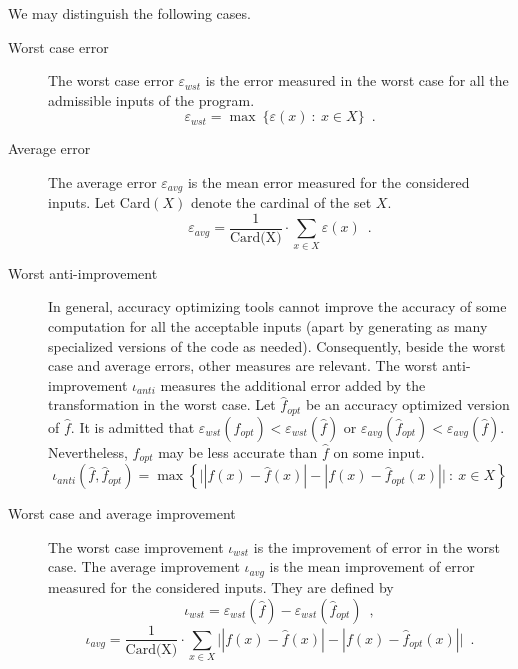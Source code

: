 \documentclass[main.tex]{subfiles}
\begin{document}
We may distinguish the following cases.
\begin{description}
\item[Worst case error] The worst case error $\varepsilon_{wst}$ is the error measured in the worst case for all the admissible inputs of the program. 
\begin{equation}
\varepsilon_{wst} = \max\ \big\{ \varepsilon(x)\ :\ x\in X \big\} \enspace .
\end{equation}
\item[Average error] The average error $\varepsilon_{avg}$ is the mean error measured for the considered inputs. Let Card$(X)$ denote
the cardinal of the set $X$.
 \begin{equation}
\varepsilon_{avg} = \frac{1}{\text{Card(X)}} \cdot \sum_{x\in X} \varepsilon(x) \enspace .
\end{equation}
\item[Worst anti-improvement] In general, accuracy optimizing tools cannot improve the accuracy of some computation for
all the acceptable inputs (apart by generating as many specialized versions of the code as needed). Consequently,
beside the worst case and average errors, other measures are relevant. The worst anti-improvement $\iota_{anti}$
measures the additional error added by the transformation in the worst case. Let $\hat{f}_{opt}$ be an accuracy optimized
version of $\hat{f}$. It is admitted that $\varepsilon_{wst}(\hat{f}_{opt})< \varepsilon_{wst}(\hat{f})$
or $\varepsilon_{avg}(\hat{f}_{opt})< \varepsilon_{avg}(\hat{f})$. Nevertheless, $\hat{f}_{opt}$ may be
less accurate than $\hat{f}$ on some input.
\begin{equation}
\iota_{anti}(\hat{f},\hat{f}_{opt}) = \max \left\{ \big| |f(x)-\hat{f}(x)| - |f(x)-\hat{f}_{opt}(x)|   
\big|\ :\ x\in X\right\}
\end{equation}
\item[Worst case and average improvement] The worst case improvement $\iota_{wst}$ is the improvement of error in the worst case. The average improvement $\iota_{avg}$ is the mean improvement of error measured 
for the considered inputs.  They are defined by
 \begin{equation}
\iota_{wst} = \varepsilon_{wst}(\hat{f}) - \varepsilon_{wst}(\hat{f}_{opt})\enspace,
\end{equation}
 \begin{equation}
\iota_{avg} = \frac{1}{\text{Card(X)}} \cdot \sum_{x\in X}  \big| |f(x)-\hat{f}(x)| - |f(x)-\hat{f}_{opt}(x)|  \big|\enspace .
\end{equation}
\end{description}
\end{document}
